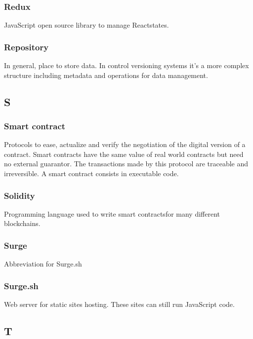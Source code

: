 \subsubsection*{Redux}
JavaScript open source library to manage React\glosp states.

\subsubsection*{Repository}
In general, place to store data. In control versioning systems it's a more complex structure including metadata and operations for data management.


\subsection*{S}

\subsubsection*{Smart contract}
Protocols to ease, actualize and verify the negotiation of the digital version of a contract. Smart contracts have the same value of real world contracts but need no external guarantor. The transactions made by this protocol are traceable and irreversible. A smart contract consists in executable code.

\subsubsection*{Solidity}
Programming language used to write smart contracts\glosp for many different blockchains\glo.

\subsubsection*{Surge}
Abbreviation for Surge.sh

\subsubsection*{Surge.sh}
Web server for static sites hosting. These sites can still run JavaScript code.


\subsection*{T}

